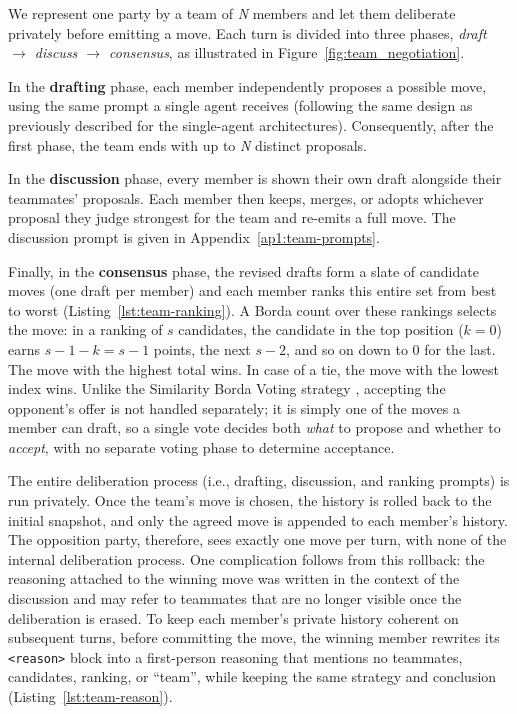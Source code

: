 We represent one party by a team of \textit{N} members and let them deliberate privately before emitting a move. Each turn is divided into three phases, \textit{draft $\rightarrow$ discuss $\rightarrow$ consensus}, as illustrated in Figure~\ref{fig:team_negotiation}. 

In the \textbf{drafting} phase, each member independently proposes a possible move, using the same prompt a single agent receives (following the same design as previously described for the single-agent architectures). Consequently, after the first phase, the team ends with up to \textit{N} distinct proposals.

In the \textbf{discussion} phase, every member is shown their own draft alongside their teammates' proposals. Each member then keeps, merges, or adopts whichever proposal they judge strongest for the team and re-emits a full move. The discussion prompt is given in Appendix~\ref{ap1:team-prompts}.

Finally, in the \textbf{consensus} phase, the revised drafts form a slate of candidate moves (one draft per member) and each member ranks this entire set from best to worst (Listing~\ref{lst:team-ranking}). A Borda count over these rankings selects the move: in a ranking of $s$ candidates, the candidate in the top position ($k=0$) earns $s-1-k = s-1$ points, the next $s-2$, and so on down to $0$ for the last. The move with the highest total wins. In case of a tie, the move with the lowest index wins. Unlike the Similarity Borda Voting strategy \cite{S_nchez_Anguix_2013}, accepting the opponent's offer is not handled separately; it is simply one of the moves a member can draft, so a single vote decides both \textit{what} to propose and whether to \textit{accept}, with no separate voting phase to determine acceptance.

The entire deliberation process (i.e., drafting, discussion, and ranking prompts) is run privately. Once the team's move is chosen, the history is rolled back to the initial snapshot, and only the agreed move is appended to each member's history. The opposition party, therefore, sees exactly one move per turn, with none of the internal deliberation process. One complication follows from this rollback: the reasoning attached to the winning move was written in the context of the discussion and may refer to teammates that are no longer visible once the deliberation is erased. To keep each member's private history coherent on subsequent turns, before committing the move, the winning member rewrites its \texttt{<reason>} block into a first-person reasoning that mentions no teammates, candidates, ranking, or ``team'', while keeping the same strategy and conclusion (Listing~\ref{lst:team-reason}).


